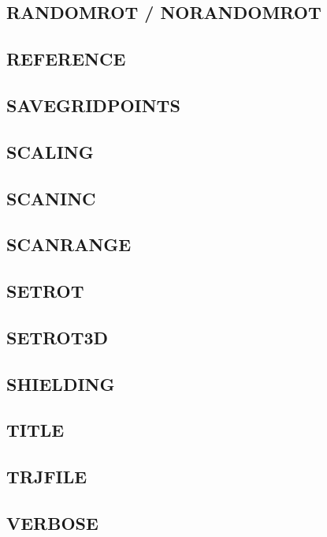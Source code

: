 \documentclass[11pt]{article}
\begin{document}
\clearpage
\subsection{RANDOMROT / NORANDOMROT}

\clearpage
\subsection{REFERENCE}

\clearpage
\subsection{SAVEGRIDPOINTS}

\clearpage
\subsection{SCALING}

\clearpage
\subsection{SCANINC}

\clearpage
\subsection{SCANRANGE}

\clearpage
\subsection{SETROT}

\clearpage
\subsection{SETROT3D}

\clearpage
\subsection{SHIELDING}

\clearpage
\subsection{TITLE}

\clearpage
\subsection{TRJFILE}

\clearpage
\subsection{VERBOSE}

\clearpage



\end{document}
